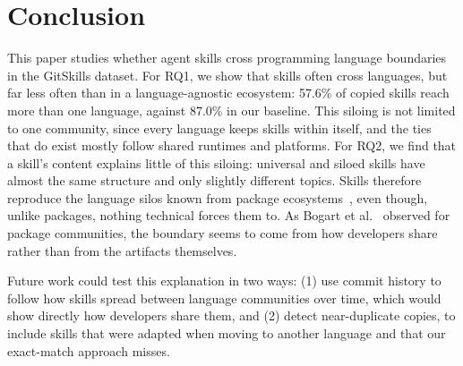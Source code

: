 \section{Conclusion}
This paper studies whether agent skills cross programming language boundaries in the GitSkills dataset. For RQ1, we show that skills often cross languages, but far less often than in a language-agnostic ecosystem: 57.6\% of copied skills reach more than one language, against 87.0\% in our baseline. This siloing is not limited to one community, since every language keeps skills within itself, and the ties that do exist mostly follow shared runtimes and platforms. For RQ2, we find that a skill's content explains little of this siloing: universal and siloed skills have almost the same structure and only slightly different topics. Skills therefore reproduce the language silos known from package ecosystems~\cite{decan2019empirical}, even though, unlike packages, nothing technical forces them to. As Bogart et al.~\cite{bogart2021breaking} observed for package communities, the boundary seems to come from how developers share rather than from the artifacts themselves.

Future work could test this explanation in two ways: (1) use commit history to follow how skills spread between language communities over time, which would show directly how developers share them, and (2) detect near-duplicate copies, to include skills that were adapted when moving to another language and that our exact-match approach misses.